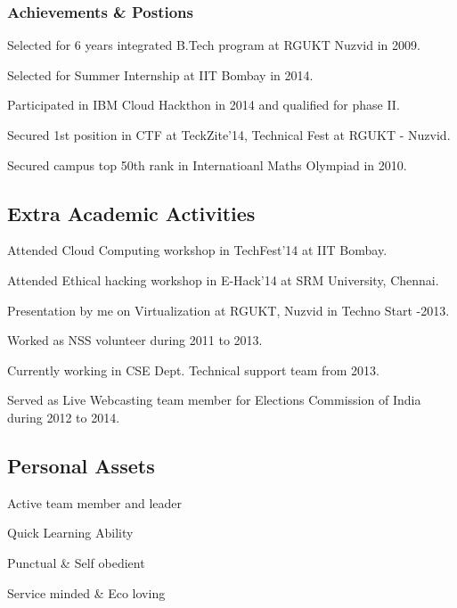 \documentclass[8pt]{article}
\begin{document}
\pagebreak 

\subsubsection*{Achievements \& Postions}
\onehalfspacing
\begin{compactitem}
	\item Selected for 6 years integrated B.Tech program at RGUKT Nuzvid in 2009.
	\item Selected for Summer Internship at IIT Bombay in 2014.
	\item Participated in IBM Cloud Hackthon in 2014 and qualified for phase II.
	\item Secured 1st position in CTF at TeckZite'14, Technical Fest at RGUKT - Nuzvid.
	\item Secured campus top 50th rank in Internatioanl Maths Olympiad in 2010.  
\end{compactitem}

\subsection*{Extra Academic Activities}
\onehalfspacing
\begin{compactitem}
	\item Attended Cloud Computing workshop in TechFest'14 at IIT Bombay. 
	\item Attended Ethical hacking workshop in E-Hack'14 at SRM University, Chennai.
	\item Presentation by me on Virtualization at RGUKT, Nuzvid in Techno Start -2013.
	\item Worked as NSS volunteer during 2011 to 2013.
	\item Currently working in CSE Dept. Technical support team from 2013. 
	\item Served as Live Webcasting team member for Elections Commission of India during 2012 to 2014.
\end{compactitem}

\subsection*{Personal Assets}
\onehalfspacing
\begin{compactitem}
	\item Active team member and leader
	\item Quick Learning Ability
	\item Punctual \& Self obedient
	\item Service minded \& Eco loving
\end{compactitem}
\end{document}
